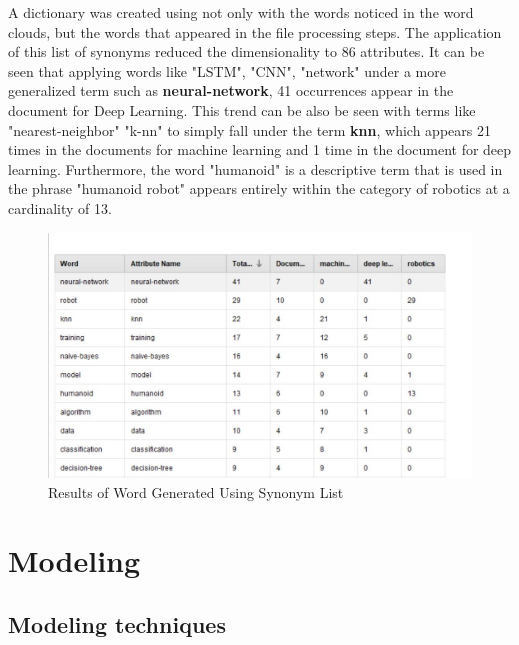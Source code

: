 A dictionary was created using not only with the words noticed in the word clouds, but the words that appeared in the file processing steps. The application of this list of synonyms reduced the dimensionality to 86 attributes. It can be seen that applying words like "LSTM", "CNN", "network" under a more generalized term such as \textbf{neural-network}, 41 occurrences appear in the document for Deep Learning. 
This trend can be also be seen with terms like "nearest-neighbor" "k-nn" to simply fall under the term \textbf{knn}, which appears 21 times in the documents for machine learning and 1 time in the document for deep learning.
Furthermore, the word "humanoid" is a descriptive term that is used in the phrase "humanoid robot" appears entirely within the category of robotics at a cardinality of 13.
\begin{figure}[ht]
	\begin{center}
		\advance\leftskip-3cm
		\advance\rightskip-3cm
		\includegraphics[keepaspectratio=true,scale=0.8]{__resources/1.JPG}
		\caption{Results of Word Generated Using Synonym List}
		\label{stop}
	\end{center}
\end{figure}






\section*{Modeling}

\subsection*{Modeling techniques}
